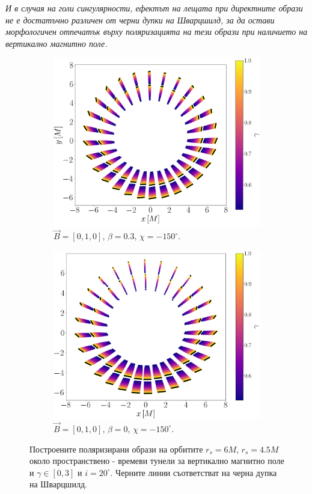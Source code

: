 \emph{И в случая на голи сингулярности, ефектът на лещата при директните образи не е достатъчно различен от черни дупки на Шварцшилд, за да остави морфологичен отпечатък върху поляризацията на тези образи при наличието на вертикално магнитно поле.}

\begin{figure}[!htb]
	\centering
	\begin{subfigure}{7cm}
		\includegraphics[scale = 0.2]{JNW_alpha_Vert_Field.png}
		\caption{$\vec{B} = [0, 1, 0]$, $\beta = 0.3$, $\chi = -150^\circ$.} 
	\end{subfigure}
	\begin{subfigure}{7cm}
		\includegraphics[scale = 0.2]{JNW_alpha_Vert_Field_beta_zero.png}
		\caption{$\vec{B} = [0, 1, 0]$, $\beta = 0$, $\chi = -150^\circ$.}
	\end{subfigure}
	\caption[Поляризирани образи около пространствено - времеви тунели за вертикално магнитно поле.]{\small Построените поляризирани образи на орбитите $r_s = 6M$, $r_s = 4.5M$ около пространствено - времеви тунели за вертикално магнитно поле и $\gamma \in[0,3]$ и $i = 20^\circ$. Черните линии съответстват на черна дупка на Шварцшилд.} 
	\label{JNW_pol_vert_field}
\end{figure}

